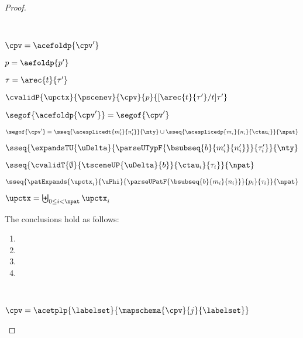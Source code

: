 \begin{grayparbox}
\begin{proof}
\begin{byCases}
    \resetpfcounter
  \item[\text{(\ref{rule:cvalidP-UP-fold})}] ~
    \begin{pfsteps*}
      \item $\cpv=\acefoldp{\cpv'}$ 
      \item $p=\aefoldp{p'}$ 
      \item $\tau=\arec{t}{\tau'}$ 
      \item $\cvalidP{\upctx}{\pscenev}{\cpv}{p}{[\arec{t}{\tau'}/t]\tau'}$  
      \item $\segof{\acefoldp{\cpv'}} = \segof{\cpv'}$  
      \item $\segof{\cpv'} = \sseq{\acesplicedt{m'_i}{n'_i}}{\nty} \cup \sseq{\acesplicedp{m_i}{n_i}{\ctau_i}}{\npat}$  
      \item $\sseq{
            \expandsTU{\uDelta}
            {
              \parseUTypF{\bsubseq{b}{m'_i}{n'_i}}
            }{\tau'_i}
          }{\nty}$  
      \item $\sseq{
        \cvalidT{\emptyset}{
          \tsceneUP
            {\uDelta}{b}
        }{
          \ctau_i
        }{\tau_i}
      }{\npat}$  
      \item $\sseq{
        \patExpands
          {\upctx_i}
          {\uPhi}
          {\parseUPatF{\bsubseq{b}{m_i}{n_i}}}
          {p_i}
          {\tau_i}
      }{\npat}$  
    \item $\upctx = \biguplus_{0 \leq i < \npat} \upctx_i$ \end{pfsteps*}
    The conclusions hold as follows:
    \begin{enumerate}
    \item {}
    \item {}
    \item {}
    \item {}
    \end{enumerate}
    \resetpfcounter
  \item[\text{(\ref{rule:cvalidP-UP-tpl})}] ~
    \begin{pfsteps*}
      \item $\cpv=\acetplp{\labelset}{\mapschema{\cpv}{j}{\labelset}}$ 

\end{pfsteps*}
\end{byCases}
\end{proof}
\end{grayparbox}
